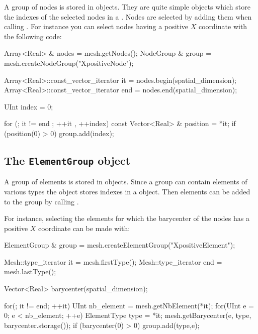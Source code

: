 A group of nodes is stored in  objects.
They are quite simple objects which store the indexes
of the selected nodes in a . 
Nodes are selected by adding them when calling 
. For instance you can select nodes 
having a positive $X$ coordinate with the following code:
\begin{cpp}
  Array<Real> & nodes = mesh.getNodes();
  NodeGroup & group = mesh.createNodeGroup("XpositiveNode");

  Array<Real>::const_vector_iterator it  = nodes.begin(spatial_dimension);
  Array<Real>::const_vector_iterator end = nodes.end(spatial_dimension);

  UInt index = 0;

  for (; it != end ; ++it , ++index){
    const Vector<Real> & position = *it; 
    if (position(0) > 0) group.add(index);
  }  
\end{cpp}

\subsection{The \texttt{ElementGroup} object}

A group of elements is stored in  objects.
Since a group can contain elements of various types 
the  object stores indexes in 
a  object.
Then elements can be added to the group by calling .

For instance, selecting the elements for which the barycenter of the nodes
has a positive $X$ coordinate can be made with:

\begin{cpp}
  ElementGroup & group = mesh.createElementGroup("XpositiveElement");

  Mesh::type_iterator it  = mesh.firstType();
  Mesh::type_iterator end = mesh.lastType();

  Vector<Real> barycenter(spatial_dimension);

  for(; it != end; ++it){
    UInt nb_element  = mesh.getNbElement(*it);
    for(UInt e = 0; e < nb_element; ++e) {
      ElementType type = *it;
      mesh.getBarycenter(e, type, barycenter.storage());
      if (barycenter(0) > 0) group.add(type,e); 
    }
  }  
\end{cpp}



